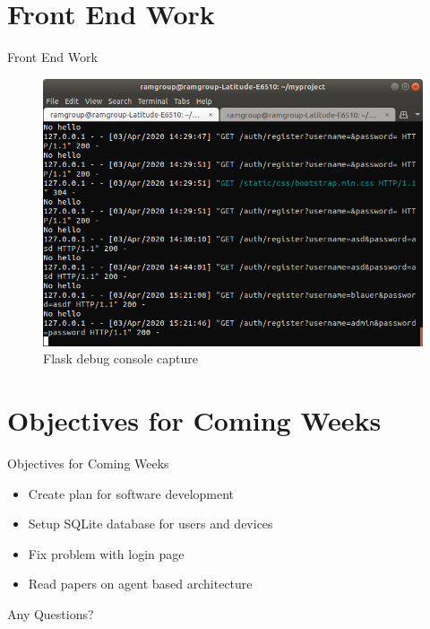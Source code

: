 \documentclass{beamer}
\begin{document}
\section{Front End Work}
\begin{frame}{Front End Work}{}
\begin{figure}
\includegraphics[scale=0.35]{../figs/img/noPost}
\caption{Flask debug console capture}
\end{figure}
\end{frame}

\section{Objectives for Coming Weeks}
\begin{frame}{Objectives for Coming Weeks}{}
\begin{itemize}
\item Create plan for software development
\item Setup SQLite database for users and devices
\item Fix problem with login page
\item Read papers on agent based architecture
\end{itemize}
\end{frame}

\begin{frame}
\center
\Huge
Any Questions?
\end{frame}
\end{document}
